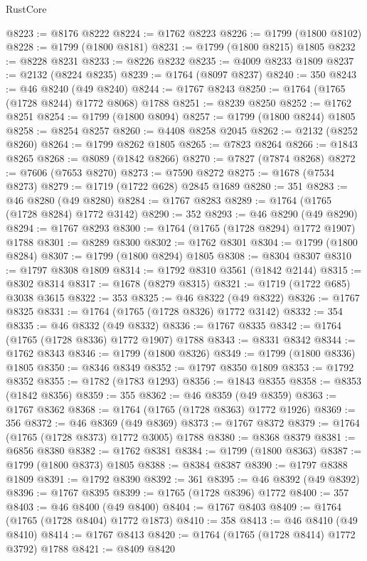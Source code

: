 \begin{lexlean}{RustCore}
\begin{coremodule}
@8223 := @8176 @8222
@8224 := @1762 @8223
@8226 := @1799 (@1800 @8102)
@8228 := @1799 (@1800 @8181)
@8231 := @1799 (@1800 @8215) @1805
@8232 := @8228 @8231
@8233 := @8226 @8232
@8235 := @4009 @8233 @1809
@8237 := @2132 (@8224 @8235)
@8239 := @1764 (@8097 @8237)
@8240 := 350
@8243 := @46 @8240 (@49 @8240)
@8244 := @1767 @8243
@8250 := @1764 (@1765 (@1728 @8244) @1772 @8068) @1788
@8251 := @8239 @8250
@8252 := @1762 @8251
@8254 := @1799 (@1800 @8094)
@8257 := @1799 (@1800 @8244) @1805
@8258 := @8254 @8257
@8260 := @4408 @8258 @2045
@8262 := @2132 (@8252 @8260)
@8264 := @1799 @8262 @1805
@8265 := @7823 @8264
@8266 := @1843 @8265
@8268 := @8089 (@1842 @8266)
@8270 := @7827 (@7874 @8268)
@8272 := @7606 (@7653 @8270)
@8273 := @7590 @8272
@8275 := @1678 (@7534 @8273)
@8279 := @1719 (@1722 @628) @2845 @1689
@8280 := 351
@8283 := @46 @8280 (@49 @8280)
@8284 := @1767 @8283
@8289 := @1764 (@1765 (@1728 @8284) @1772 @3142)
@8290 := 352
@8293 := @46 @8290 (@49 @8290)
@8294 := @1767 @8293
@8300 := @1764 (@1765 (@1728 @8294) @1772 @1907) @1788
@8301 := @8289 @8300
@8302 := @1762 @8301
@8304 := @1799 (@1800 @8284)
@8307 := @1799 (@1800 @8294) @1805
@8308 := @8304 @8307
@8310 := @1797 @8308 @1809
@8314 := @1792 @8310 @3561 (@1842 @2144)
@8315 := @8302 @8314
@8317 := @1678 (@8279 @8315)
@8321 := @1719 (@1722 @685) @3038 @3615
@8322 := 353
@8325 := @46 @8322 (@49 @8322)
@8326 := @1767 @8325
@8331 := @1764 (@1765 (@1728 @8326) @1772 @3142)
@8332 := 354
@8335 := @46 @8332 (@49 @8332)
@8336 := @1767 @8335
@8342 := @1764 (@1765 (@1728 @8336) @1772 @1907) @1788
@8343 := @8331 @8342
@8344 := @1762 @8343
@8346 := @1799 (@1800 @8326)
@8349 := @1799 (@1800 @8336) @1805
@8350 := @8346 @8349
@8352 := @1797 @8350 @1809
@8353 := @1792 @8352
@8355 := @1782 (@1783 @1293)
@8356 := @1843 @8355
@8358 := @8353 (@1842 @8356)
@8359 := 355
@8362 := @46 @8359 (@49 @8359)
@8363 := @1767 @8362
@8368 := @1764 (@1765 (@1728 @8363) @1772 @1926)
@8369 := 356
@8372 := @46 @8369 (@49 @8369)
@8373 := @1767 @8372
@8379 := @1764 (@1765 (@1728 @8373) @1772 @3005) @1788
@8380 := @8368 @8379
@8381 := @6856 @8380
@8382 := @1762 @8381
@8384 := @1799 (@1800 @8363)
@8387 := @1799 (@1800 @8373) @1805
@8388 := @8384 @8387
@8390 := @1797 @8388 @1809
@8391 := @1792 @8390
@8392 := 361
@8395 := @46 @8392 (@49 @8392)
@8396 := @1767 @8395
@8399 := @1765 (@1728 @8396) @1772
@8400 := 357
@8403 := @46 @8400 (@49 @8400)
@8404 := @1767 @8403
@8409 := @1764 (@1765 (@1728 @8404) @1772 @1873)
@8410 := 358
@8413 := @46 @8410 (@49 @8410)
@8414 := @1767 @8413
@8420 := @1764 (@1765 (@1728 @8414) @1772 @3792) @1788
@8421 := @8409 @8420

\end{coremodule}
\end{lexlean}
